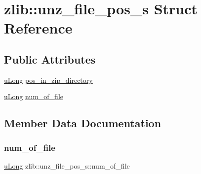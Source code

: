 \hypertarget{structzlib_1_1unz__file__pos__s}{}\section{zlib\+:\+:unz\+\_\+file\+\_\+pos\+\_\+s Struct Reference}
\label{structzlib_1_1unz__file__pos__s}
\subsection*{Public Attributes}
\begin{DoxyCompactItemize}
\item 
\hyperlink{namespacezlib_a3bc0123d9337acd75d286df79e6cf7da}{u\+Long} \hyperlink{structzlib_1_1unz__file__pos__s_addc3e7a77fb2eda9c5d0246847aea36f}{pos\+\_\+in\+\_\+zip\+\_\+directory}
\item 
\hyperlink{namespacezlib_a3bc0123d9337acd75d286df79e6cf7da}{u\+Long} \hyperlink{structzlib_1_1unz__file__pos__s_ae6ed3b3dc7ab5bb4c8e8acfe5dab34a3}{num\+\_\+of\+\_\+file}
\end{DoxyCompactItemize}


\subsection{Member Data Documentation}
\mbox{\label{structzlib_1_1unz__file__pos__s_ae6ed3b3dc7ab5bb4c8e8acfe5dab34a3}} 
\subsubsection{\texorpdfstring{num\+\_\+of\+\_\+file}{num\_of\_file}}
{\footnotesize\ttfamily \hyperlink{namespacezlib_a3bc0123d9337acd75d286df79e6cf7da}{u\+Long} zlib\+::unz\+\_\+file\+\_\+pos\+\_\+s\+::num\+\_\+of\+\_\+file}

\mbox{\label{structzlib_1_1unz__file__pos__s_addc3e7a77fb2eda9c5d0246847aea36f}} 
